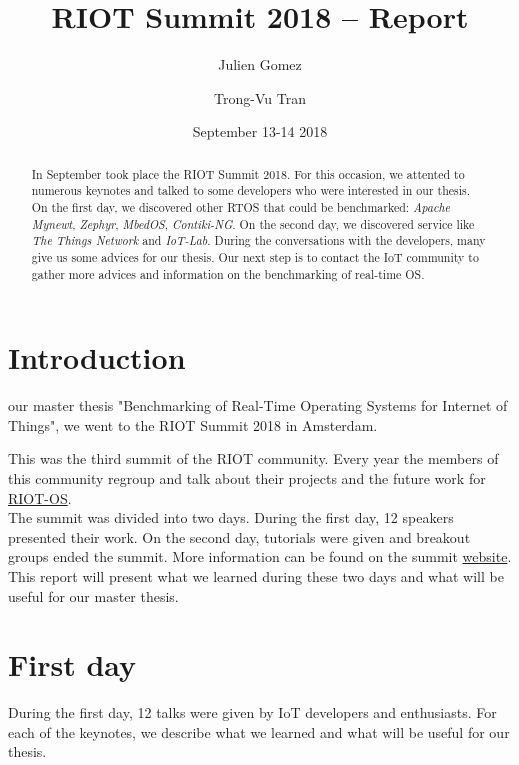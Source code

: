 \documentclass[journal, a4paper]{../IEEEtran}
\begin{document}
\title{RIOT Summit 2018 -- Report}
\author{Julien Gomez \and Trong-Vu Tran}
\date{September 13-14 2018}
\maketitle

\begin{abstract}
    In September took place the RIOT Summit 2018.
	For this occasion, we attented to numerous keynotes and talked to some developers who were interested in our thesis. 
    On the first day, we discovered other RTOS that could be benchmarked: \textit{Apache Mynewt}, \textit{Zephyr}, \textit{MbedOS}, \textit{Contiki-NG}. 
    On the second day, we discovered service like \textit{The Things Network} and \textit{IoT-Lab}.
    During the conversations with the developers, many give us some advices for our thesis. 
    Our next step is to contact the IoT community to gather more advices and information on the benchmarking of real-time OS.
\end{abstract}

\section{Introduction}
 our master thesis "Benchmarking of Real-Time Operating Systems for Internet of Things", we went to the RIOT Summit 2018 in Amsterdam.
    
This was the third summit of the RIOT community. 
Every year the members of this community regroup and talk about their projects and the future work for \href{http://riot-os.org}{RIOT-OS}. \\

The summit was divided into two days. 
During the first day, 12 speakers presented their work. On the second day, tutorials were given and breakout groups ended the summit. 
More information can be found on the summit \href{http://summit.riot-os.org/2018/}{website}. \\

This report will present what we learned during these two days and what will be useful for our master thesis.

\section{First day}
During the first day, 12 talks were given by IoT developers and enthusiasts.
For each of the keynotes, we describe what we learned and what will be useful for our thesis.
\end{document}
